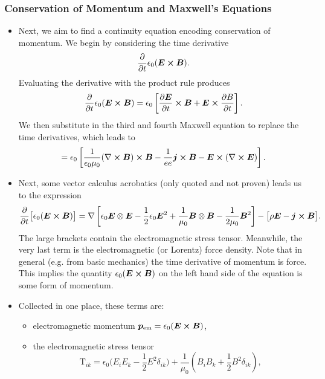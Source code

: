 \documentclass[11pt, a4paper]{article}
\renewcommand{\vec}[1]{\bm{#1}} %
\newcommand{\E}{\vec{E}} %
\newcommand{\B}{\vec{B}} %
\newcommand{\TT}{\mathrm{T}}  %
\newcommand{\ee}{\epsilon_{0}}  %
\newcommand{\mm}{\mu_{0}}  %
\renewcommand{\j}{\vec{j}}  %
\renewcommand{\curl}{\nabla \cross}
\renewcommand{\grad}{\nabla}
\begin{document}
\subsubsection{Conservation of Momentum and Maxwell's Equations}
\begin{itemize}
	\item Next, we aim to find a continuity equation encoding conservation of momentum. We begin by considering the time derivative
	\begin{equation*}
		\pdv{t}\ee (\E \cross \B).
	\end{equation*}
	Evaluating the derivative with the product rule produces
	\begin{equation*}
		\pdv{t}\ee (\E \cross \B) = \ee \left[\pdv{\E}{t}\cross \B + \E \cross \pdv{B}{t}\right].
	\end{equation*}
	We then substitute in the third and fourth Maxwell equation to replace the time derivatives, which leads to
	\begin{equation*}
		= \ee \left[\frac{1}{\ee \mm}(\curl \B)\cross \B - \frac{1}{ee}\j \cross \B - \E \cross (\curl \E)\right].
	\end{equation*}
	
    \item Next, some vector calculus acrobatics (only quoted and not proven) leads us to the expression
	\begin{equation*}
		\pdv{t}\big[\ee (\E \cross \B)\big] = \grad \left[\ee \E \otimes \E - \frac{1}{2}\ee \E^{2} + \frac{1}{\mm} \B \otimes \B - \frac{1}{2\mm}\B^{2}\right] - \big[\rho \E - \j \cross \B\big].
	\end{equation*}
	The large brackets contain the electromagnetic stress tensor. Meanwhile, the very last term is the electromagnetic (or Lorentz) force density. Note that in general (e.g. from basic mechanics) the time derivative of momentum is force. This implies the quantity $ \ee (\E \cross \B) $ on the left hand side of the equation is some form of momentum.
	
	\item Collected in one place, these terms are:
    \begin{itemize}
        \item electromagnetic momentum $ \vec{p}_{\text{em}} = \ee (\E \cross \B) $,

        \item the electromagnetic stress tensor 
        \begin{equation*}
            \TT_{ik} = \ee \big(E_{i}E_{k} - \frac{1}{2}E^{2}\delta_{ik}\big) + \frac{1}{\mm}\left(B_{i}B_{k} + \frac{1}{2}B^{2}\delta_{ik}\right),
        \end{equation*}
        

\end{itemize}
\end{itemize}
\end{document}
